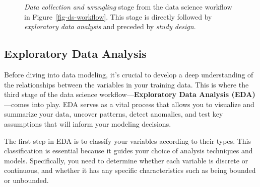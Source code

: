 \documentclass[
  letterpaper,
  DIV=11,
  numbers=noendperiod]{scrreprt}
\begin{document}
\begin{figure}


\caption{\label{fig-ds-workflow-data-collection-wrangling}\emph{Data
collection and wrangling} stage from the data science workflow in
Figure~\ref{fig-ds-workflow}. This stage is directly followed by
\emph{exploratory data analysis} and preceded by \emph{study design}.}

\end{figure}%

\subsection{Exploratory Data Analysis}\label{sec-ds-workflow-eda}

Before diving into data modeling, it's crucial to develop a deep
understanding of the relationships between the variables in your
training data. This is where the third stage of the data science
workflow---\textbf{Exploratory Data Analysis (EDA)}---comes into play.
EDA serves as a vital process that allows you to visualize and summarize
your data, uncover patterns, detect anomalies, and test key assumptions
that will inform your modeling decisions.

The first step in EDA is to classify your variables according to their
types. This classification is essential because it guides your choice of
analysis techniques and models. Specifically, you need to determine
whether each variable is discrete or continuous, and whether it has any
specific characteristics such as being bounded or unbounded.
\end{document}
